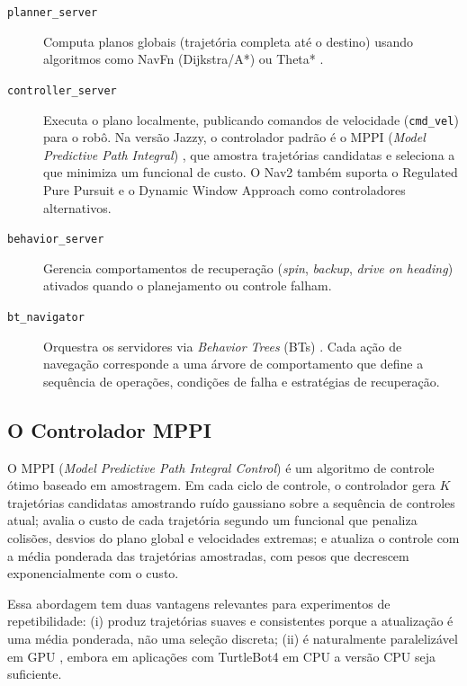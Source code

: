 \begin{description}
    \item[\texttt{planner\_\allowbreak server}] Computa planos globais (trajetória completa
    até o destino) usando algoritmos como NavFn (Dijkstra/A*) ou Theta* \cite{macenski2020marathon}.

    \item[\texttt{controller\_\allowbreak server}] Executa o plano localmente, publicando
    comandos de velocidade (\texttt{cmd\_\allowbreak vel}) para o robô. Na versão Jazzy,
    o controlador padrão é o MPPI (\textit{Model Predictive Path Integral})
    \cite{williams2016}, que amostra trajetórias candidatas e seleciona a que
    minimiza um funcional de custo. O Nav2 também suporta o Regulated Pure Pursuit
    \cite{macenski2023survey} e o Dynamic Window Approach \cite{fox1997} como
    controladores alternativos.

    \item[\texttt{behavior\_\allowbreak server}] Gerencia comportamentos de recuperação
    (\textit{spin}, \textit{backup}, \textit{drive on heading}) ativados quando
    o planejamento ou controle falham.

    \item[\texttt{bt\_\allowbreak navigator}] Orquestra os servidores via \textit{Behavior Trees}
    (BTs) \cite{colledanchise2018, macenski2020marathon}. Cada ação de navegação corresponde a uma
    árvore de comportamento que define a sequência de operações, condições de
    falha e estratégias de recuperação.
\end{description}

\subsection{O Controlador MPPI}
\label{sec:mppi}

O MPPI (\textit{Model Predictive Path Integral Control}) \cite{williams2016} é um
algoritmo de controle ótimo baseado em amostragem. Em cada ciclo de controle, o
controlador gera $K$ trajetórias candidatas amostrando ruído gaussiano sobre a
sequência de controles atual; avalia o custo de cada trajetória segundo um funcional
que penaliza colisões, desvios do plano global e velocidades extremas; e atualiza
o controle com a média ponderada das trajetórias amostradas, com pesos que decrescem
exponencialmente com o custo.

Essa abordagem tem duas vantagens relevantes para experimentos de repetibilidade:
(i) produz trajetórias suaves e consistentes porque a atualização é uma média ponderada,
não uma seleção discreta; (ii) é naturalmente paralelizável em GPU \cite{williams2016}, embora em
aplicações com TurtleBot4 em CPU a versão CPU seja suficiente.

